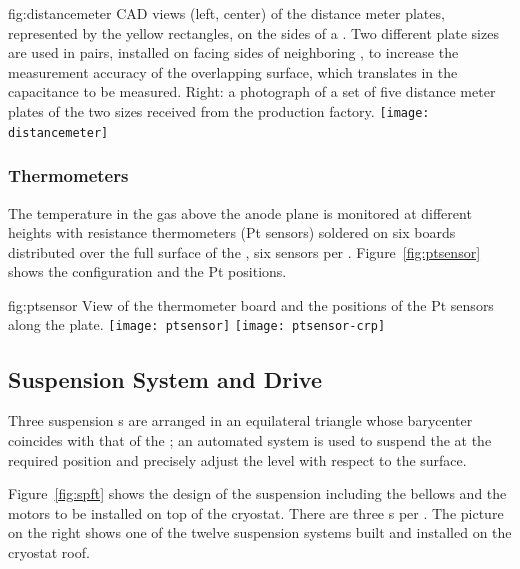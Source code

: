 \begin{dunefigure}{fig:distancemeter}
{CAD views (left, center) of the distance meter plates, represented by the yellow rectangles, on the sides of a . Two different plate sizes are used in pairs, installed on facing sides of neighboring , %
to increase the measurement accuracy of the overlapping surface, which translates in the capacitance to be measured. Right: a photograph of a set of five distance meter plates of the two sizes received from the production factory.}
\texttt{[image: distancemeter]}
\end{dunefigure}

\subsubsection{Thermometers}

The temperature in the gas above the anode plane is monitored at different heights with resistance thermometers (Pt sensors) soldered on  six  boards distributed over the full surface of the , six 
sensors per . Figure~\ref{fig:ptsensor} shows the configuration and the Pt positions.

\begin{dunefigure}{fig:ptsensor}
{View of the thermometer board and the positions of the Pt sensors along the  plate.}
\texttt{[image: ptsensor]}
\texttt{[image: ptsensor-crp]}
\end{dunefigure}


\subsection{Suspension System and Drive}
\label{sec:fddp-crp-suspension}

Three suspension \fdth{}s are arranged in an equilateral triangle whose barycenter coincides with that of the ; an automated system is used to suspend the  at the required position and precisely adjust the  level with respect to the  surface.

Figure~\ref{fig:spft} shows the design of the suspension \fdth including the bellows and the motors to be installed on top of the cryostat. There are three \fdth{}s per . The picture on the right shows one of the twelve suspension systems built and installed on the  cryostat roof.

